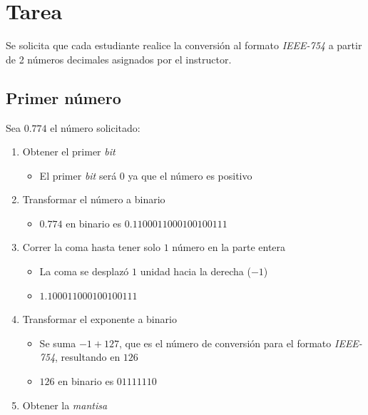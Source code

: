 \documentclass[12pt]{article}
\begin{document}
\section{Tarea}%
\label{sec:tarea}

Se solicita que cada estudiante realice la conversión al formato 
\textit{IEEE-754} a partir de 2 números decimales asignados por el instructor.

\subsection{Primer número}%
\label{sub:primer_número}

Sea $0.774$ el número solicitado:
\begin{enumerate}
    \setlength{\parskip}{-8pt}
    \item Obtener el primer \textit{bit} 
        \begin{itemize}
            \setlength{\parskip}{-8pt}
            \item El primer \textit{bit} será $0$ ya que el número es positivo
        \end{itemize}
    \item Transformar el número a binario
        \begin{itemize}
            \setlength{\parskip}{-8pt}
            \item $0.774$ en binario es $0.1100011000100100111$
        \end{itemize}
    \item Correr la coma hasta tener solo $1$ número en la parte entera
        \begin{itemize}
            \setlength{\parskip}{-8pt}
            \item La coma se desplazó $1$ unidad hacia la derecha ($-1$)
            \item $1.100011000100100111$
        \end{itemize}
    \item Transformar el exponente a binario
        \begin{itemize}
            \setlength{\parskip}{-8pt}
            \item Se suma $-1 + 127$, que es el número de conversión para el
                formato \textit{IEEE-754}, resultando en $126$
            \item $126$ en binario es $01111110$
        \end{itemize}
    \item Obtener la \textit{mantisa} 
        \begin{itemize}

\end{itemize}
\end{enumerate}
\end{document}
